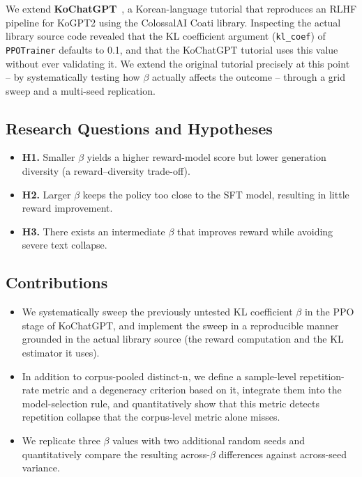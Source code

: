 \documentclass[conference]{IEEEtran}
\begin{document}
We extend \textbf{KoChatGPT}~\cite{kochatgpt2023,
colossalchat2023}, a Korean-language tutorial that reproduces an RLHF
pipeline for KoGPT2 using the ColossalAI Coati library. Inspecting the
actual library source code revealed that the KL coefficient argument
(\texttt{kl\_coef}) of \texttt{PPOTrainer} defaults to 0.1, and that
the KoChatGPT tutorial uses this value without ever validating it.
We extend the original tutorial precisely at this point -- by
systematically testing how $\beta$ actually affects the outcome --
through a grid sweep and a multi-seed replication.

\subsection{Research Questions and Hypotheses}
\begin{itemize}
  \item \textbf{H1.} Smaller $\beta$ yields a higher reward-model
        score but lower generation diversity (a reward--diversity
        trade-off).
  \item \textbf{H2.} Larger $\beta$ keeps the policy too close to the
        SFT model, resulting in little reward improvement.
  \item \textbf{H3.} There exists an intermediate $\beta$ that improves
        reward while avoiding severe text collapse.
\end{itemize}

\subsection{Contributions}
\begin{itemize}
  \item We systematically sweep the previously untested KL coefficient
        $\beta$ in the PPO stage of KoChatGPT, and implement the sweep
        in a reproducible manner grounded in the actual library source
        (the reward computation and the KL estimator it uses).
  \item In addition to corpus-pooled distinct-n, we define a
        sample-level repetition-rate metric and a degeneracy criterion
        based on it, integrate them into the model-selection rule, and
        quantitatively show that this metric detects repetition
        collapse that the corpus-level metric alone misses.
  \item We replicate three $\beta$ values with two additional random
        seeds and quantitatively compare the resulting across-$\beta$
        differences against across-seed variance.
\end{itemize}
\end{document}
